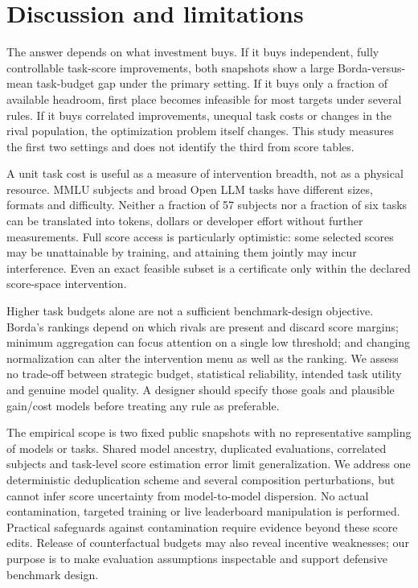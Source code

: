 \section{Discussion and limitations}
\label{sec:limitations}
The answer depends on what investment buys. If it buys independent, fully controllable task-score improvements, both snapshots show a large Borda-versus-mean task-budget gap under the primary setting. If it buys only a fraction of available headroom, first place becomes infeasible for most targets under several rules. If it buys correlated improvements, unequal task costs or changes in the rival population, the optimization problem itself changes. This study measures the first two settings and does not identify the third from score tables.

A unit task cost is useful as a measure of intervention breadth, not as a physical resource. MMLU subjects and broad Open LLM tasks have different sizes, formats and difficulty. Neither a fraction of 57 subjects nor a fraction of six tasks can be translated into tokens, dollars or developer effort without further measurements. Full score access is particularly optimistic: some selected scores may be unattainable by training, and attaining them jointly may incur interference. Even an exact feasible subset is a certificate only within the declared score-space intervention.

Higher task budgets alone are not a sufficient benchmark-design objective. Borda's rankings depend on which rivals are present and discard score margins; minimum aggregation can focus attention on a single low threshold; and changing normalization can alter the intervention menu as well as the ranking. We assess no trade-off between strategic budget, statistical reliability, intended task utility and genuine model quality. A designer should specify those goals and plausible gain/cost models before treating any rule as preferable.

The empirical scope is two fixed public snapshots with no representative sampling of models or tasks. Shared model ancestry, duplicated evaluations, correlated subjects and task-level score estimation error limit generalization. We address one deterministic deduplication scheme and several composition perturbations, but cannot infer score uncertainty from model-to-model dispersion. No actual contamination, targeted training or live leaderboard manipulation is performed. Practical safeguards against contamination require evidence beyond these score edits. Release of counterfactual budgets may also reveal incentive weaknesses; our purpose is to make evaluation assumptions inspectable and support defensive benchmark design.

